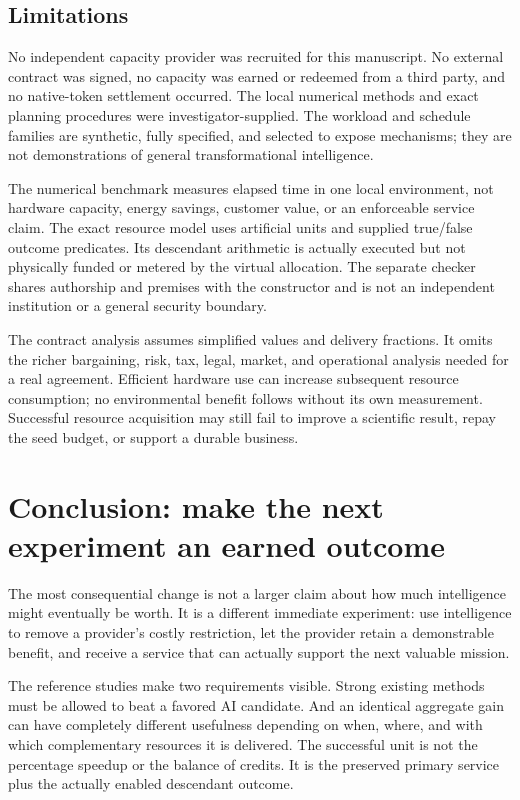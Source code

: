 \documentclass[11pt,letterpaper]{article}
\theoremstyle{remark}\newtheorem{remark}{Remark}[section]
\begin{document}
\subsection{Limitations}
No independent capacity provider was recruited for this manuscript. No external contract was signed, no capacity was earned or redeemed from a third party, and no native-token settlement occurred. The local numerical methods and exact planning procedures were investigator-supplied. The workload and schedule families are synthetic, fully specified, and selected to expose mechanisms; they are not demonstrations of general transformational intelligence.

The numerical benchmark measures elapsed time in one local environment, not hardware capacity, energy savings, customer value, or an enforceable service claim. The exact resource model uses artificial units and supplied true/false outcome predicates. Its descendant arithmetic is actually executed but not physically funded or metered by the virtual allocation. The separate checker shares authorship and premises with the constructor and is not an independent institution or a general security boundary.

The contract analysis assumes simplified values and delivery fractions. It omits the richer bargaining, risk, tax, legal, market, and operational analysis needed for a real agreement. Efficient hardware use can increase subsequent resource consumption; no environmental benefit follows without its own measurement. Successful resource acquisition may still fail to improve a scientific result, repay the seed budget, or support a durable business.

\section{Conclusion: make the next experiment an earned outcome}
The most consequential change is not a larger claim about how much intelligence might eventually be worth. It is a different immediate experiment: use intelligence to remove a provider's costly restriction, let the provider retain a demonstrable benefit, and receive a service that can actually support the next valuable mission.

The reference studies make two requirements visible. Strong existing methods must be allowed to beat a favored AI candidate. And an identical aggregate gain can have completely different usefulness depending on when, where, and with which complementary resources it is delivered. The successful unit is not the percentage speedup or the balance of credits. It is the preserved primary service plus the actually enabled descendant outcome.
\end{document}
